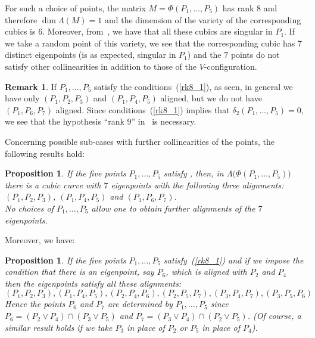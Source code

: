 \documentclass{amsart}
\theoremstyle{plain}
\newtheorem{prop}[lemma]{Proposition}
\theoremstyle{definition}
\newtheorem{rmk}[lemma]{Remark}
\begin{document}
For such a choice
of points, the matrix $M = \Phi(P_1, \dots, P_5)$ has rank $8$
and therefore $\dim \Lambda(M) = 1$ and the dimension of the variety
of the corresponding cubics is $6$.
Moreover, from~, we have that all these cubics
are singular in $P_1$.
If we take a random point of this variety, we see that the corresponding
cubic has $7$ distinct eigenpoints (is as expected, singular in $P_1$) and the
$7$ points do not satisfy other collinearities in addition to those of the
$V$-configuration.

\begin{rmk}
\label{rmk:particular_cases}
If $P_1, \dots, P_5$ satisfy the conditions~(\ref{rk8_1}), as seen,
in general we have only $(P_1, P_2, P_3)$ and $(P_1, P_4, P_5)$ aligned, but
we do not have $(P_1, P_6, P_7)$ aligned. Since conditions~(\ref{rk8_1})
implies that $\delta_2(P_1, \dots, P_5) = 0$, we see
that the hypothesis ``rank $9$''
in~ is necessary.
\end{rmk}

Concerning possible sub-cases with further collinearities of the points,
the following results hold:
\begin{prop}
\label{three_d_three_alignments}
If the five points $P_1, \dots, P_5$ satisfy ,
then, in $\Lambda \bigl( \Phi(P_1, \dotsc, P_5)\bigr)$ there is
a cubic curve with $7$ eigenpoints with the following three alignments:
$(P_1, P_2, P_3)$, $(P_1, P_4, P_5)$ and $(P_1, P_6, P_7)$. \\
No choices of $P_1, \dots, P_5$ allow one to obtain further alignments of the
$7$ eigenpoints.
\end{prop}

Moreover, we have:

\begin{prop}
\label{prop:d2_6allin}
If the five points $P_1, \dots, P_5$ satisfy~(\ref{rk8_1})
and if we impose the condition that there is an eigenpoint, say $P_6$,
which is aligned with $P_2$ and $P_4$ then the eigenpoints satisfy all these
alignments:
%
\[
  (P_1, P_2, P_3), (P_1, P_4, P_5),
  (P_2, P_4, P_6), (P_2, P_5, P_7),
  (P_3, P_4, P_7), (P_3, P_5, P_6)
\]
%
Hence the points $P_6$ and $P_7$ are determined by $P_1, \dots, P_5$
since
$P_6 = (P_2 \vee P_4) \cap (P_3 \vee P_5)$
and $P_7 = (P_3 \vee P_4) \cap (P_2 \vee P_5)$.
(Of course, a similar result holds if we take $P_3$ in place of $P_2$ or $P_5$
in place of $P_4$).
\end{prop}
\end{document}
